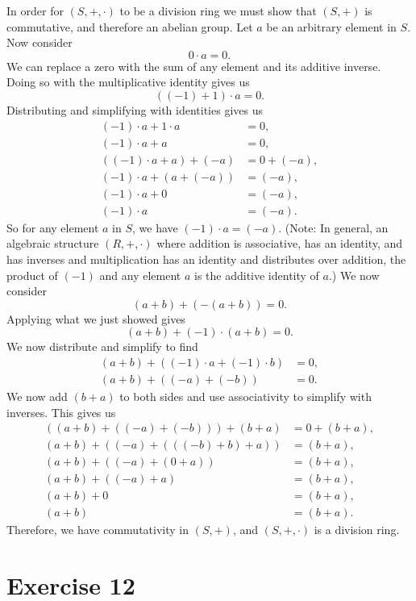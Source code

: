 \documentclass[12pt]{article}
\begin{document}
In order for $(S, +, \cdot)$ to be a division ring we must show that $(S, +)$ is commutative, and therefore an abelian group. Let $a$ be an arbitrary element in $S$. Now consider
\[0\cdot a = 0.\]
We can replace a zero with the sum of any element and its additive inverse. Doing so with the multiplicative identity gives us
\[((-1)+1)\cdot a = 0.\]
Distributing and simplifying with identities gives us
\begin{align*}
    (-1)\cdot a + 1\cdot a &= 0, \\
    (-1)\cdot a + a &= 0, \\
    ((-1)\cdot a + a) + (-a) &= 0 +(-a), \\
    (-1)\cdot a + (a + (-a)) &= (-a), \\
    (-1)\cdot a + 0 &= (-a), \\
    (-1)\cdot a &= (-a).
\end{align*}
So for any element $a$ in $S$, we have $(-1)\cdot a = (-a)$. (Note: In general, an algebraic structure $(R,+,\cdot)$ where addition is associative, has an identity, and has inverses and multiplication has an identity and distributes over addition, the product of $(-1)$ and any element $a$ is the additive identity of $a$.) We now consider
\[(a+b) + (-(a+b)) = 0.\]
Applying what we just showed gives
\[(a+b) + (-1)\cdot(a+b) = 0.\]
We now distribute and simplify to find
\begin{align*}
    (a+b) + ((-1)\cdot a + (-1)\cdot b) &= 0, \\
    (a+b) + ((-a) + (-b)) &= 0.
\end{align*}
We now add $(b+a)$ to both sides and use associativity to simplify with inverses. This gives us
\begin{align*}
    ((a+b) + ((-a) + (-b))) + (b+a) &= 0 + (b+a), \\
    (a+b) + ((-a) + (((-b)+ b)+a)) &= (b+a), \\
    (a+b) + ((-a) + (0+a)) &= (b+a), \\
    (a+b) + ((-a) + a) &= (b+a), \\
    (a+b) + 0 &= (b+a), \\
    (a+b) &= (b+a).
\end{align*}
Therefore, we have commutativity in $(S,+)$, and $(S,+,\cdot)$ is a division ring.


\section*{Exercise 12}
\\
\end{document}
